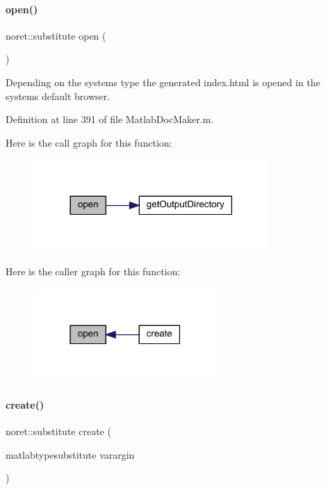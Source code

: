 \paragraph{\texorpdfstring{open()}{open()}}
{\footnotesize\ttfamily noret\+::substitute open (\begin{DoxyParamCaption}{ }\end{DoxyParamCaption})\hspace{0.3cm}{\ttfamily [static]}}

Depending on the system{\ttfamily s type the generated index.\+html is opened in the system}s default browser. 

Definition at line 391 of file Matlab\+Doc\+Maker.\+m.

Here is the call graph for this function\+:\nopagebreak
\begin{figure}[H]
\begin{center}
\leavevmode
\includegraphics[width=254pt]{class_matlab_doc_maker_ac477800dc8332769ae7a542a49aa6d0c_cgraph}
\end{center}
\end{figure}
Here is the caller graph for this function\+:\nopagebreak
\begin{figure}[H]
\begin{center}
\leavevmode
\includegraphics[width=198pt]{class_matlab_doc_maker_ac477800dc8332769ae7a542a49aa6d0c_icgraph}
\end{center}
\end{figure}
\mbox{\label{class_matlab_doc_maker_ad140908baecf279ebe64dc7c17f32b51}} 
\paragraph{\texorpdfstring{create()}{create()}}
{\footnotesize\ttfamily noret\+::substitute create (\begin{DoxyParamCaption}\item[{matlabtypesubstitute}]{varargin }\end{DoxyParamCaption})\hspace{0.3cm}{\ttfamily [static]}}


